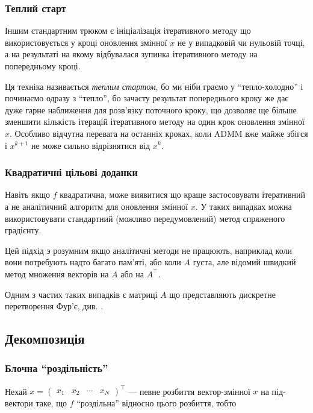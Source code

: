 \subsubsection{Теплий старт}

Іншим стандартним трюком є ініціалізація ітеративного методу що використовується у кроці оновлення змінної $x$ не у випадковій чи нульовій точці, а на результаті на якому відбувалася зупинка ітеративного методу на попередньому кроці. \medskip

Ця техніка називається \textit{теплим стартом}, бо ми ніби граємо у ``тепло-холодно'' і починаємо одразу з ``тепло'', бо зачасту результат попереднього кроку же дає дуже гарне наближення для розв'язку поточного кроку, що дозволяє ще більше зменшити кількість ітерацій ітеративного методу на один крок оновлення змінної $x$. Особливо відчутна перевага на останніх кроках, коли ADMM вже майже збігся і $x^{k + 1}$ не може сильно відрізнятися від $x^k$.

\subsubsection{Квадратичні цільові доданки}

Навіть якщо $f$ квадратична, може виявитися що краще застосовувати ітеративний а не аналітичний алгоритм для оновлення змінної $x$. У таких випадках можна  використовувати стандартний (можливо передумовлений) метод спряженого градієнту.
\medskip

Цей підхід э розумним якщо аналітичні методи не працюють, наприклад коли вони потребують надто багато пам'яті, або коли $A$ густа, але відомий швидкий метод множення векторів на $A$ або на $A^\intercal$.

\begin{example}
    Одним з частих таких випадків є матриці $A$ що представляють дискретне перетворення Фур'є, див. \cite{90}.
\end{example}

\subsection{Декомпозиція}

\subsubsection{Блочна ``роздільність''}

Нехай $x = \begin{pmatrix} x_1 & x_2 & \cdots & x_N \end{pmatrix}^\intercal$ --- певне розбиття вектор-змінної $x$ на під-вектори таке, що $f$ ``роздільна'' відносно цього розбиття, тобто 

